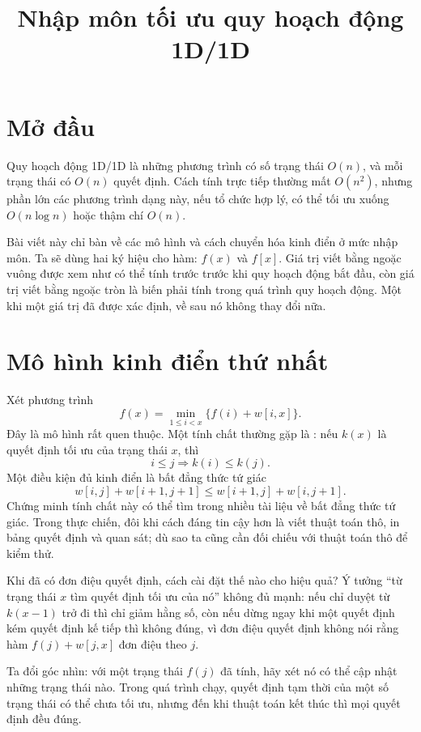 \documentclass[11pt]{article}
\title{Nhập môn tối ưu quy hoạch động 1D/1D}
\author{}
\date{}
\begin{document}
\maketitle


\section*{Mở đầu}

Quy hoạch động 1D/1D là những phương trình có số trạng thái $O(n)$, và mỗi
trạng thái có $O(n)$ quyết định. Cách tính trực tiếp thường mất $O(n^2)$,
nhưng phần lớn các phương trình dạng này, nếu tổ chức hợp lý, có thể tối ưu
xuống $O(n\log n)$ hoặc thậm chí $O(n)$.

Bài viết này chỉ bàn về các mô hình và cách chuyển hóa kinh điển ở mức nhập
môn. Ta sẽ dùng hai ký hiệu cho hàm: $f(x)$ và $f[x]$. Giá trị viết bằng ngoặc
vuông được xem như có thể tính trước trước khi quy hoạch động bắt đầu, còn
giá trị viết bằng ngoặc tròn là biến phải tính trong quá trình quy hoạch động.
Một khi một giá trị đã được xác định, về sau nó không thay đổi nữa.

\section{Mô hình kinh điển thứ nhất}

Xét phương trình
\[
  f(x)=\min_{1\le i<x}\{f(i)+w[i,x]\}.
\]
Đây là mô hình rất quen thuộc. Một tính chất thường gặp là : nếu $k(x)$ là quyết định tối ưu của trạng thái $x$, thì
\[
  i\le j \Longrightarrow k(i)\le k(j).
\]
Một điều kiện đủ kinh điển là bất đẳng thức tứ giác
\[
  w[i,j]+w[i+1,j+1]\le w[i+1,j]+w[i,j+1].
\]
Chứng minh tính chất này có thể tìm trong nhiều tài liệu về bất đẳng thức tứ
giác. Trong thực chiến, đôi khi cách đáng tin cậy hơn là viết thuật toán thô,
in bảng quyết định và quan sát; dù sao ta cũng cần đối chiếu với thuật toán
thô để kiểm thử.

Khi đã có đơn điệu quyết định, cách cài đặt thế nào cho hiệu quả? Ý tưởng
``từ trạng thái $x$ tìm quyết định tối ưu của nó'' không đủ mạnh: nếu chỉ
duyệt từ $k(x-1)$ trở đi thì chỉ giảm hằng số, còn nếu dừng ngay khi một quyết
định kém quyết định kế tiếp thì không đúng, vì đơn điệu quyết định không nói
rằng hàm $f(j)+w[j,x]$ đơn điệu theo $j$.

Ta đổi góc nhìn: với một trạng thái $f(j)$ đã tính, hãy xét nó có thể cập
nhật những trạng thái nào. Trong quá trình chạy, quyết định tạm thời của một
số trạng thái có thể chưa tối ưu, nhưng đến khi thuật toán kết thúc thì mọi
quyết định đều đúng.
\end{document}
